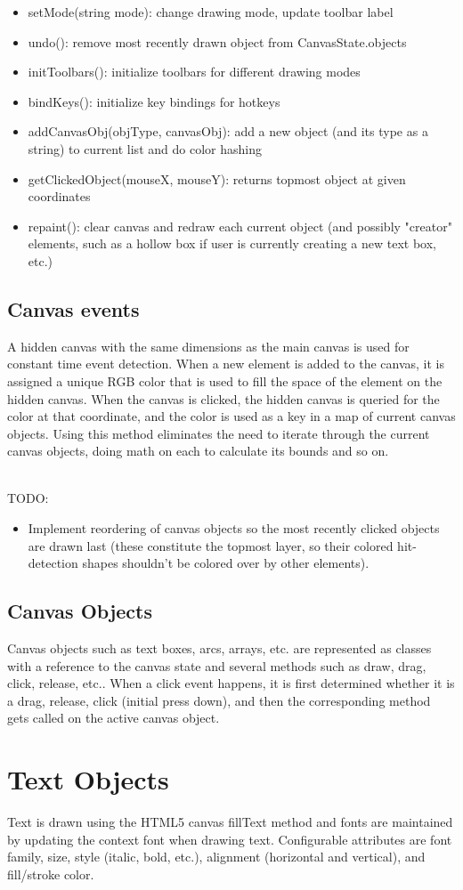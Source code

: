 \documentclass{article}
\begin{document}
\begin{itemize}
\item setMode(string mode): change drawing mode, update toolbar label
\item undo(): remove most recently drawn object from CanvasState.objects
\item initToolbars(): initialize toolbars for different drawing modes
\item bindKeys(): initialize key bindings for hotkeys
\item addCanvasObj(objType, canvasObj): add a new object (and its type as a string) to current list 
and do color hashing
\item getClickedObject(mouseX, mouseY): returns topmost object at given coordinates
\item repaint(): clear canvas and redraw each current object (and possibly "creator" elements, such
as a hollow box if user is currently creating a new text box, etc.)
\end{itemize}


\subsection*{Canvas events}
A hidden canvas with the same dimensions as the main canvas is used for 
constant time event detection. When a new element is added to the canvas, it is
assigned a unique RGB color that is used to fill the space of the element on the hidden
canvas. When the canvas is clicked, the hidden canvas is queried for the color
at that coordinate, and the color is used as a key in a map of current canvas objects.
Using this method eliminates the need to iterate through the current canvas objects,
doing math on each to calculate its bounds and so on.

~\\TODO:
\begin{itemize}
\item Implement reordering of canvas objects so the most recently clicked objects
are drawn last (these constitute the topmost layer, so their colored hit-detection
shapes shouldn't be colored over by other elements).

\end{itemize}

\subsection*{Canvas Objects}
Canvas objects such as text boxes, arcs, arrays, etc. are represented as classes 
with a reference to the canvas state and several methods such as draw, drag, click,
release, etc.. When a click event happens, it is first determined whether it is a 
drag, release, click (initial press down), and then the corresponding method
gets called on the active canvas object.


\section{Text Objects}
Text is drawn using the HTML5 canvas fillText method and fonts are maintained by updating
the context font when drawing text. Configurable attributes are font family, size, 
style (italic, bold, etc.), alignment (horizontal and vertical), and fill/stroke color.
\end{document}
